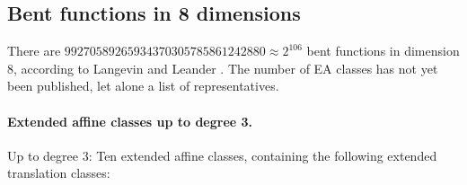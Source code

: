 \documentclass[12pt,a4paper]{article}
\begin{document}
\subsection{Bent functions in 8 dimensions}

There are
$99 270 589 265 934 370 305 785 861 242 880 \approx 2^{106}$ bent functions in dimension 8,
according to Langevin and Leander \cite{LanL11counting}.
%
%
The number of EA classes has not yet been published, let alone a list of representatives.

\paragraph*{Extended affine classes up to degree 3.}
%
Up to degree 3:
Ten extended affine classes, containing the following extended translation classes:
\end{document}
